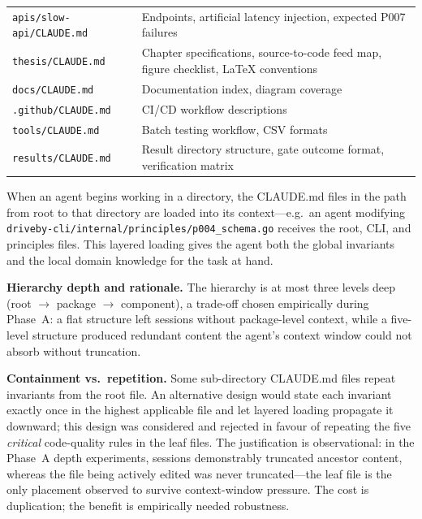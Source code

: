 \begin{table}[htbp]
\begin{tabular}{@{}p{} p{}@{}}
\texttt{apis/slow-api/CLAUDE.md}                    & Endpoints, artificial latency injection, expected P007 failures \\
\texttt{thesis/CLAUDE.md}                          & Chapter specifications, source-to-code feed map, figure checklist, LaTeX conventions \\
\texttt{docs/CLAUDE.md}                            & Documentation index, diagram coverage \\
\texttt{.github/CLAUDE.md}                         & CI/CD workflow descriptions \\
\texttt{tools/CLAUDE.md}                           & Batch testing workflow, CSV formats \\
\texttt{results/CLAUDE.md}                         & Result directory structure, gate outcome format, verification matrix \\
\bottomrule
\end{tabular}
\end{table}

When an agent begins working in a directory, the CLAUDE.md files in the path from root to that directory are loaded into its context---e.g.\ an agent modifying \texttt{driveby-cli/internal/principles/p004\_schema.go} receives the root, CLI, and principles files. This layered loading gives the agent both the global invariants and the local domain knowledge for the task at hand.

\textbf{Hierarchy depth and rationale.} The hierarchy is at most three levels deep (root $\to$ package $\to$ component), a trade-off chosen empirically during Phase~A: a flat structure left sessions without package-level context, while a five-level structure produced redundant content the agent's context window could not absorb without truncation.

\textbf{Containment vs.\ repetition.} Some sub-directory CLAUDE.md files repeat invariants from the root file. An alternative design would state each invariant exactly once in the highest applicable file and let layered loading propagate it downward; this design was considered and rejected in favour of repeating the five \emph{critical} code-quality rules in the leaf files. The justification is observational: in the Phase~A depth experiments, sessions demonstrably truncated ancestor content, whereas the file being actively edited was never truncated---the leaf file is the only placement observed to survive context-window pressure. The cost is duplication; the benefit is empirically needed robustness.

